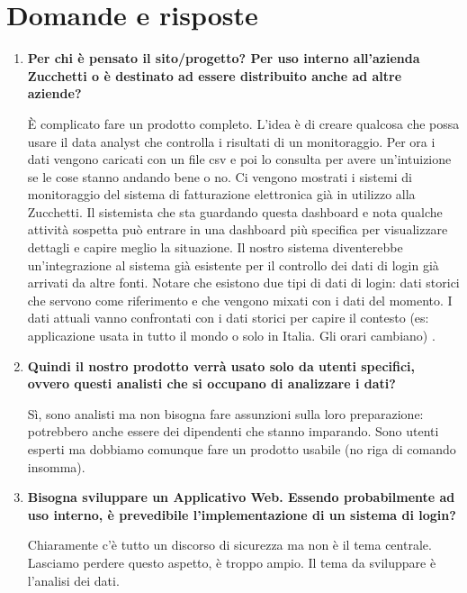 \documentclass[11pt]{article}
\begin{document}
	\section{Domande e risposte}
		\begin{enumerate}
			\item \textbf{Per chi è pensato il sito/progetto? Per uso interno all’azienda Zucchetti o è destinato ad essere distribuito anche ad altre aziende?} 
			
			\medskip
			
			È complicato fare un prodotto completo. L'idea è di creare qualcosa che possa usare il data analyst che controlla i risultati di un monitoraggio. Per ora i dati vengono caricati con un file csv e poi lo consulta per avere un'intuizione se le cose stanno andando bene o no. Ci vengono mostrati i sistemi di monitoraggio del sistema di fatturazione elettronica già in utilizzo alla Zucchetti. Il sistemista che sta guardando questa dashboard e nota qualche attività sospetta può entrare in una dashboard più specifica per visualizzare dettagli e capire meglio la situazione. Il nostro sistema diventerebbe un'integrazione al sistema già esistente per il controllo dei dati di login già arrivati da altre fonti. 
			Notare che esistono due tipi di dati di login: dati storici che servono come riferimento e che vengono mixati con i dati del momento. I dati attuali vanno confrontati con i dati storici per capire il contesto (es: applicazione usata in tutto il mondo o solo in Italia. Gli orari cambiano) .
			
			\bigskip
			
			\item \textbf{Quindi il nostro prodotto verrà usato solo da utenti specifici, ovvero questi analisti che si occupano di analizzare i dati?}
			
			\medskip
			
			Sì, sono analisti ma non bisogna fare assunzioni sulla loro preparazione: potrebbero anche essere dei dipendenti che stanno imparando. Sono utenti esperti ma dobbiamo comunque fare un prodotto usabile (no riga di comando insomma).
			
			\bigskip 
			
			\item \textbf{Bisogna sviluppare un Applicativo Web. Essendo probabilmente ad uso interno, è prevedibile l’implementazione di un sistema di login?}
			
			\medskip
			
			Chiaramente c'è tutto un discorso di sicurezza ma non è il tema centrale. Lasciamo perdere questo aspetto, è troppo ampio. Il tema da sviluppare è l'analisi dei dati.
			

\end{enumerate}
\end{document}
